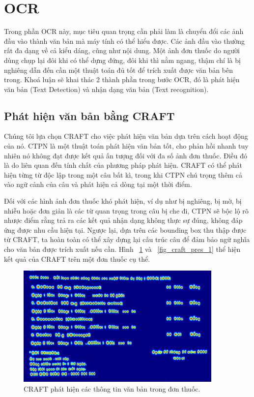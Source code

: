 \section{OCR}

Trong phần OCR này, mục tiêu quan trọng cần phải làm là chuyển đổi các ảnh đầu vào thành văn bản mà máy tính có thể hiểu được. Các ảnh đầu vào thường rất đa dạng về cả kiểu dáng, cũng như nội dung. Một ảnh đơn thuốc do người dùng chụp lại đôi khi có thể dựng đứng, đôi khi thì nằm ngang, thậm chí là bị nghiêng dẫn đến cần một thuật toán đủ tốt để trích xuất được văn bản bên trong. Khoá luận sẽ khai thác 2 thành phần trong bước OCR, đó là phát hiện văn bản (Text Detection) và nhận dạng văn bản (Text recognition).

\subsection{Phát hiện văn bản bằng CRAFT}

Chúng tôi lựa chọn CRAFT cho việc phát hiện văn bản dựa trên cách hoạt động của nó. CTPN \cite{tian2016detecting} là một thuật toán phát hiện văn bản tốt, cho phản hồi nhanh tuy nhiên nó không đạt được kết quả ấn tượng đối với đa số ảnh đơn thuốc. Điều đó là do liên quan đến tính chất của phương pháp phát hiện. CRAFT có thể phát hiện từng từ độc lập trong một câu bất kì, trong khi CTPN chú trọng thêm cả vào ngữ cảnh của câu và phát hiện cả dòng tại một thời điểm.

Đối với các hình ảnh đơn thuốc khó phát hiện, ví dụ như bị nghiêng, bị mờ, bị nhiễu hoặc đơn giản là các từ quan trọng trong câu bị che đi, CTPN sẽ bộc lộ rõ nhược điểm rằng trả ra các kết quả nhận dạng không thực sự đúng, không đáp ứng được nhu cầu hiện tại. Ngược lại, dựa trên các bounding box thu thập được từ CRAFT, ta hoàn toàn có thể xây dựng lại cấu trúc câu để đảm bảo ngữ nghĩa cho văn bản được trích xuất nếu cần. Hình ~\ref{fig_craft_pres_2} và ~\ref{fig_craft_pres_1} thể hiện kết quả của CRAFT trên một đơn thuốc cụ thể. 

\begin{figure}
\centering
\includegraphics[width=0.9\textwidth]{mep_img/craft_pres_2.png}
\caption{CRAFT phát hiện các thông tin văn bản trong đơn thuốc.}\label{fig_craft_pres_2}
\end{figure}

